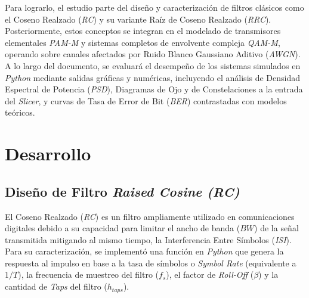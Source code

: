 \documentclass[12pt,a4paper]{article}
\begin{document}
Para lograrlo, el estudio parte del diseño y caracterización de filtros clásicos como el Coseno Realzado (\textit{RC}) y su variante Raíz de Coseno Realzado (\textit{RRC}). Posteriormente, estos conceptos se integran en el modelado de transmisores elementales \textit{PAM-M} y sistemas completos de envolvente compleja \textit{QAM-M}, operando sobre canales afectados por Ruido Blanco Gaussiano Aditivo (\textit{AWGN}). A lo largo del documento, se evaluará el desempeño de los sistemas simulados en \textit{Python} mediante salidas gráficas y numéricas, incluyendo el análisis de Densidad Espectral de Potencia (\textit{PSD}), Diagramas de Ojo y de Constelaciones a la entrada del \textit{Slicer}, y curvas de Tasa de Error de Bit (\textit{BER}) contrastadas con modelos teóricos.



\section{Desarrollo}                                                        \label{sec_2}
\subsection{Diseño de Filtro \textit{Raised Cosine (RC)}}                   \label{sec_2.1}
El Coseno Realzado (\textit{RC}) es un filtro ampliamente utilizado en comunicaciones digitales debido a su capacidad para limitar el ancho de banda ($BW$) de la señal transmitida mitigando al mismo tiempo, la Interferencia Entre Símbolos (\textit{ISI}). Para su caracterización, se implementó una función en \textit{Python} \cite{b1} que genera la respuesta al impulso en base a la tasa de símbolos o \textit{Symbol Rate} (equivalente a $1/T$), la frecuencia de muestreo del filtro ($f_{s}$), el factor de \textit{Roll-Off} ($\beta$) y la cantidad de \textit{Taps} del filtro ($h_{taps}$).
\end{document}
